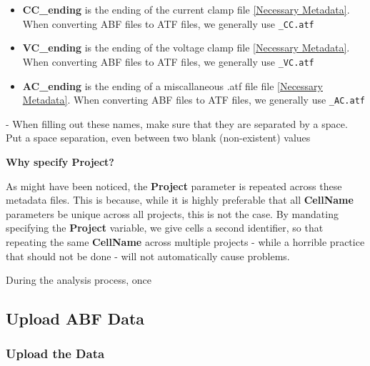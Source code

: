 \documentclass{article}
\begin{document}
\begin{itemize}
\begin{itemize}
        \item \textbf{CC\_ending} is the ending of the current clamp file \ref{Necessary Metadata}. When converting ABF files to ATF files, we generally use \verb|_CC.atf|
        
        \item \textbf{VC\_ending} is the ending of the voltage clamp file \ref{Necessary Metadata}. When converting ABF files to ATF files, we generally use \verb|_VC.atf|
        
        \item \textbf{AC\_ending} is the ending of a miscallaneous .atf file file \ref{Necessary Metadata}. When converting ABF files to ATF files, we generally use \verb|_AC.atf|
    \end{itemize}
    
    - When filling out these names, make sure that they are separated by a space. Put a space separation, even between two blank (non-existent) values
\end{itemize}

\textbf{Why specify Project?}

As might have been noticed, the \textbf{Project} parameter is repeated across these metadata files. This is because, while it is highly preferable that all \textbf{CellName} parameters be unique across all projects, this is not the case. By mandating specifying the \textbf{Project} variable, we give cells a second identifier, so that repeating the same \textbf{CellName} across multiple projects - while a horrible practice that should not be done - will not automatically cause problems.

During the analysis process, once

\subsection{Upload ABF Data} \label{Upload ABF}

\subsubsection{Upload the Data}
\end{document}
